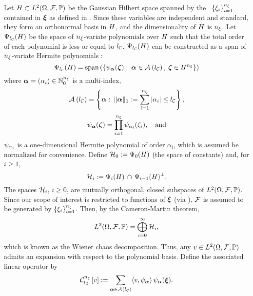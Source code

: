 Let $H \subset L^{2}(\Omega, \mathcal{F}, \mathbb{P})$ be the Gaussian Hilbert space \cite{janson1997} spanned by the \rvs\ $\{ \xi_i \}_{i = 1}^{n_\xi}$ contained in $\bm{\xi}$ as defined in .
Since these variables are independent and standard, they form an orthonormal basis in $H$, and the dimensionality of $H$ is ${n_\xi}$.
Let $\Psi_{l_\mathcal{C}}(H)$ be the space of ${n_\xi}$-variate polynomials over $H$ such that the total order of each polynomial is less or equal to ${l_\mathcal{C}}$.
$\Psi_{l_\mathcal{C}}(H)$ can be constructed as a span of ${n_\xi}$-variate Hermite polynomials \cite{maitre2010, eldred2008}:
\[
  \Psi_{l_\mathcal{C}}(H) = \text{span}\left( \left\{ \psi_{\bm{\alpha}}(\bm{\zeta}): \: \bm{\alpha} \in \mathcal{A}_{}\left( {l_\mathcal{C}} \right), \: \bm{\zeta} \in H^{n_\xi} \right\} \right)
\]
where $\bm{\alpha} = (\alpha_i) \in \mathbb{N}_{0}^{n_\xi}$ is a multi-index,
\begin{equation} \xelab{isotropic-total-order-index-set}
  \chaosMultiindexSet{\nclevel} = \left\{ \multiindex: \: \norm[1]{\multiindex} := \sum_{i = 1}^\nvars |\alpha_i| \leq \nclevel \right\},
\end{equation}
\[
  \psi_{\bm{\alpha}}(\bm{\zeta}) = \prod_{i = 1}^{n_\xi} \psi_{\alpha_i}(\zeta_i), \hspace{1em} \text{and}
\]
$\psi_{\alpha_i}$ is a one-dimensional Hermite polynomial of order $\alpha_i$, which is assumed be normalized for convenience.
Define $\mathcal{H}_0 := \Psi_0(H)$ (the space of constants) and, for $i \geq 1$,
\[
  \mathcal{H}_i := \Psi_i(H) \, \cap \, \Psi_{i - 1}(H)^\perp.
\]
The spaces $\mathcal{H}_i$, $i \geq 0$, are mutually orthogonal, closed subspaces of $L^{2}(\Omega, \mathcal{F}, \mathbb{P})$.
Since our scope of interest is restricted to functions of $\bm{\xi}$ (via ), $\mathcal{F}$ is assumed to be generated by $\{ \xi_i \}_{i = 1}^{n_\xi}$.
Then, by the Cameron-Martin theorem,
\[
  L^{2}(\Omega, \mathcal{F}, \mathbb{P}) = \bigoplus_{i = 0}^\infty \mathcal{H}_i,
\]
which is known as the Wiener chaos decomposition.
Thus, any $v \in L^{2}(\Omega, \mathcal{F}, \mathbb{P})$ admits an expansion with respect to the polynomial basis.
Define the associated linear operator by
\begin{equation} \xelab{spectral-decomposition}
  \chaos{\nvars}{\nclevel}{\w} := \sum_{\multiindex \in \chaosMultiindexSet{\nclevel}} \innerProduct{\w, \polynomial_{\multiindex}} \, \polynomial_{\multiindex}(\vz).
\end{equation}
